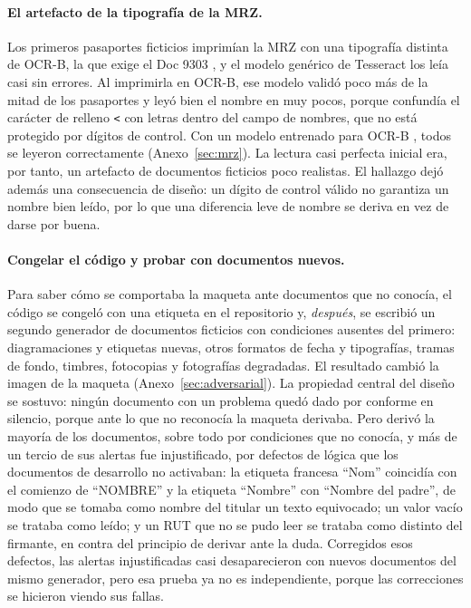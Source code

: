 \documentclass[11pt,a4paper]{article}
\begin{document}
\paragraph{El artefacto de la tipografía de la MRZ.} Los primeros pasaportes ficticios imprimían la MRZ con una tipografía distinta de OCR-B, la que exige el Doc 9303 \cite{icao9303}, y el modelo genérico de Tesseract los leía casi sin errores. Al imprimirla en OCR-B, ese modelo validó poco más de la mitad de los pasaportes y leyó bien el nombre en muy pocos, porque confundía el carácter de relleno \texttt{<} con letras dentro del campo de nombres, que no está protegido por dígitos de control. Con un modelo entrenado para OCR-B \cite{doubango}, todos se leyeron correctamente (Anexo~\ref{sec:mrz}). La lectura casi perfecta inicial era, por tanto, un artefacto de documentos ficticios poco realistas. El hallazgo dejó además una consecuencia de diseño: un dígito de control válido no garantiza un nombre bien leído, por lo que una diferencia leve de nombre se deriva en vez de darse por buena.

\paragraph{Congelar el código y probar con documentos nuevos.} Para saber cómo se comportaba la maqueta ante documentos que no conocía, el código se congeló con una etiqueta en el repositorio y, \emph{después}, se escribió un segundo generador de documentos ficticios con condiciones ausentes del primero: diagramaciones y etiquetas nuevas, otros formatos de fecha y tipografías, tramas de fondo, timbres, fotocopias y fotografías degradadas. El resultado cambió la imagen de la maqueta (Anexo~\ref{sec:adversarial}). La propiedad central del diseño se sostuvo: ningún documento con un problema quedó dado por conforme en silencio, porque ante lo que no reconocía la maqueta derivaba. Pero derivó la mayoría de los documentos, sobre todo por condiciones que no conocía, y más de un tercio de sus alertas fue injustificado, por defectos de lógica que los documentos de desarrollo no activaban: la etiqueta francesa ``Nom'' coincidía con el comienzo de ``NOMBRE'' y la etiqueta ``Nombre'' con ``Nombre del padre'', de modo que se tomaba como nombre del titular un texto equivocado; un valor vacío se trataba como leído; y un RUT que no se pudo leer se trataba como distinto del firmante, en contra del principio de derivar ante la duda. Corregidos esos defectos, las alertas injustificadas casi desaparecieron con nuevos documentos del mismo generador, pero esa prueba ya no es independiente, porque las correcciones se hicieron viendo sus fallas.
\end{document}
